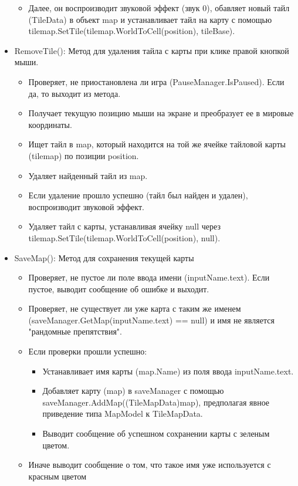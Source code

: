 \begin{itemize}
\begin{itemize}
        \item Далее, он воспроизводит звуковой эффект (звук 0), обавляет новый тайл (TileData) в объект map и устанавливает тайл на карту с помощью tilemap.SetTile(tilemap.WorldToCell(position), tileBase).
    \end{itemize}
    \item RemoveTile(): Метод для удаления тайла с карты при клике правой кнопкой мыши.
    \begin{itemize}
        \item Проверяет, не приостановлена ли игра (PauseManager.IsPaused). Если да, то выходит из метода.
        \item Получает текущую позицию мыши на экране и преобразует ее в мировые координаты.
        \item Ищет тайл в map, который находится на той же ячейке тайловой карты (tilemap) по позиции position.
        \item Удаляет найденный тайл из map.
        \item Если удаление прошло успешно (тайл был найден и удален), воспроизводит звуковой эффект.
        \item Удаляет тайл с карты, устанавливая ячейку null через tilemap.SetTile(tilemap.WorldToCell(position), null).
    \end{itemize}
    \item SaveMap(): Метод для сохранения текущей карты
    \begin{itemize}
        \item Проверяет, не пустое ли поле ввода имени (inputName.text). Если пустое, выводит сообщение об ошибке и выходит.
        \item Проверяет, не существует ли уже карта с таким же именем (saveManager.GetMap(inputName.text) == null) и имя не является "рандомные препятствия".
        \item Если проверки прошли успешно:
        \begin{itemize}
            \item Устанавливает имя карты (map.Name) из поля ввода inputName.text.
            \item Добавляет карту (map) в saveManager с помощью saveManager.AddMap((TileMapData)map), предполагая явное приведение типа MapModel к TileMapData.
            \item Выводит сообщение об успешном сохранении карты с зеленым цветом.
        \end{itemize}
        \item Иначе выводит сообщение о том, что такое имя уже используется с красным цветом
    \end{itemize}
\end{itemize}
